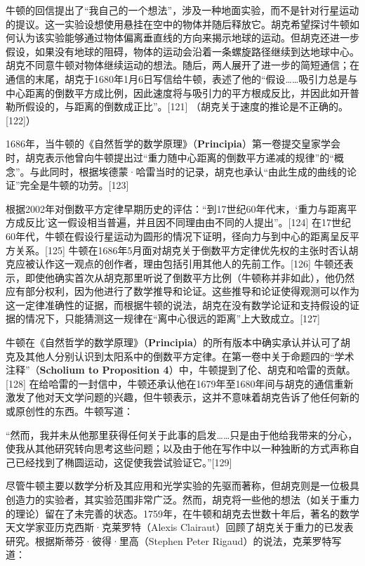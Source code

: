 牛顿的回信提出了“我自己的一个想法”，涉及一种地面实验，而不是针对行星运动的提议。这一实验设想使用悬挂在空中的物体并随后释放它。胡克希望探讨牛顿如何认为该实验能够通过物体偏离垂直线的方向来揭示地球的运动。但胡克还进一步假设，如果没有地球的阻碍，物体的运动会沿着一条螺旋路径继续到达地球中心。胡克不同意牛顿对物体继续运动的想法。随后，两人展开了进一步的简短通信；在通信的末尾，胡克于1680年1月6日写信给牛顿，表述了他的“假设……吸引力总是与中心距离的倒数平方成比例，因此速度将与吸引力的平方根成反比，并因此如开普勒所假设的，与距离的倒数成正比”。[121] （胡克关于速度的推论是不正确的。[122]）

1686年，当牛顿的《自然哲学的数学原理》（\textbf{Principia}）第一卷提交皇家学会时，胡克表示他曾向牛顿提出过“重力随中心距离的倒数平方递减的规律”的“概念”。与此同时，根据埃德蒙·哈雷当时的记录，胡克也承认“由此生成的曲线的论证”完全是牛顿的功劳。[123]  

根据2002年对倒数平方定律早期历史的评估：“到17世纪60年代末，‘重力与距离平方成反比’这一假设相当普遍，并且因不同理由由不同的人提出”。[124] 在17世纪60年代，牛顿在假设行星运动为圆形的情况下证明，径向力与到中心的距离呈反平方关系。[125] 牛顿在1686年5月面对胡克关于倒数平方定律优先权的主张时否认胡克应被认作这一观点的创作者，理由包括引用其他人的先前工作。[126] 牛顿还表示，即使他确实首次从胡克那里听说了倒数平方比例（牛顿称并非如此），他仍然应有部分权利，因为他进行了数学推导和论证。这些推导和论证使得观测可以作为这一定律准确性的证据，而根据牛顿的说法，胡克在没有数学论证和支持假设的证据的情况下，只能猜测这一规律在“离中心很远的距离”上大致成立。[127]

牛顿在《自然哲学的数学原理》（\textbf{Principia}）的所有版本中确实承认并认可了胡克及其他人分别认识到太阳系中的倒数平方定律。在第一卷中关于命题四的“学术注释”（\textbf{Scholium to Proposition 4}）中，牛顿提到了伦、胡克和哈雷的贡献。[128] 在给哈雷的一封信中，牛顿还承认他在1679年至1680年间与胡克的通信重新激发了他对天文学问题的兴趣，但牛顿表示，这并不意味着胡克告诉了他任何新的或原创性的东西。牛顿写道：

“然而，我并未从他那里获得任何关于此事的启发……只是由于他给我带来的分心，使我从其他研究转向思考这些问题；以及由于他在写作中以一种独断的方式声称自己已经找到了椭圆运动，这促使我尝试验证它。”[129]

尽管牛顿主要以数学分析及其应用和光学实验的先驱而著称，但胡克则是一位极具创造力的实验者，其实验范围非常广泛。然而，胡克将一些他的想法（如关于重力的理论）留在了未完善的状态。1759年，在牛顿和胡克去世数十年后，著名的数学天文学家亚历克西斯·克莱罗特（Alexis Clairaut）回顾了胡克关于重力的已发表研究。根据斯蒂芬·彼得·里高（Stephen Peter Rigaud）的说法，克莱罗特写道：

